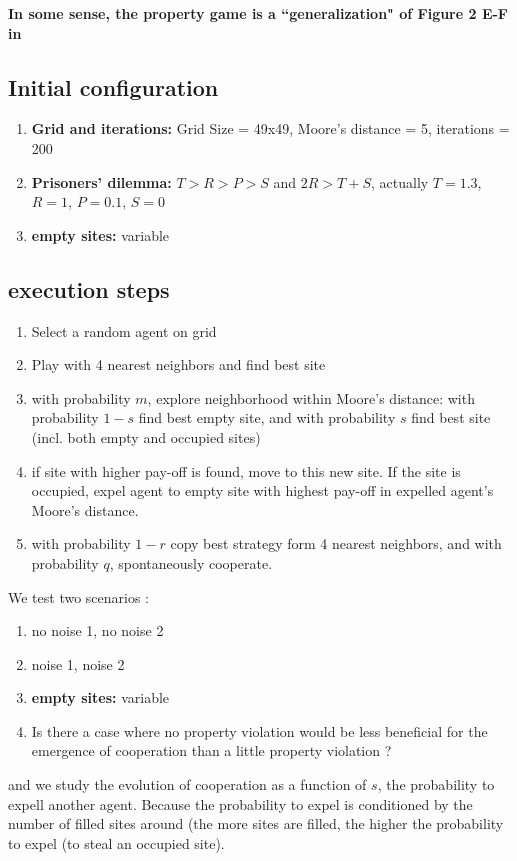 {\bf In some sense, the property game is a ``generalization" of Figure 2 E-F in \cite{helbing2009}}


\subsection*{Initial configuration}

\begin{enumerate}
  \item  {\bf Grid and iterations:} Grid Size = 49x49, Moore's distance = 5, iterations = 200
  \item {\bf Prisoners' dilemma:} $T>R>P>S$ and $2R > T+ S$, actually $T=1.3$, $R = 1$, $P=0.1$, $S=0$
  \item {\bf empty sites:} variable
\end{enumerate}


\subsection*{execution steps}


\begin{enumerate}
\item Select a random agent on grid
\item Play with 4 nearest neighbors and find best site
\item with probability $m$, explore neighborhood within Moore's distance: with probability $1-s$ find best empty site, and with probability $s$ find best site (incl. both empty and occupied sites)
\item if site with higher pay-off is found, move to this new site. If the site is occupied, expel agent to empty site with highest pay-off in expelled agent's Moore's distance.
\item with probability $1-r$ copy best strategy form 4 nearest neighbors, and with probability $q$, spontaneously cooperate.
\end{enumerate}


We test two scenarios :
\begin{enumerate}
  \item no noise 1, no noise 2
  \item noise 1, noise 2
  \item {\bf empty sites:} variable
  \item Is there a case where no property violation would be less beneficial  for the emergence of cooperation than a little property violation ?
\end{enumerate}

and we study the evolution of cooperation as a function of $s$, the probability to expell another agent. Because the probability to expel is conditioned by the number of filled sites around (the more sites are filled, the higher the probability to expel (to steal an occupied site).

